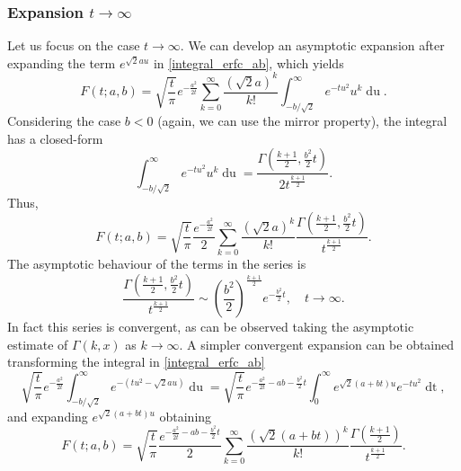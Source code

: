 \documentclass[10pt,a4paper,oneside]{article}
\numberwithin{equation}{section}
\begin{document}
\subsubsection{Expansion $t \to \infty$}

Let us focus on the case $t \to \infty$. We can develop an asymptotic expansion after expanding the term $e^{\sqrt{2}au}$ in \eqref{integral_erfc_ab}, which yields
\begin{equation*}
F(t; a, b) = \sqrt{\frac{t}{\pi}} e^{-\frac{a^2}{2t}} \sum_{k=0}^{\infty}\frac{(\sqrt{2}a)^k}{k!}\int_{-b/\sqrt{2}}^{\infty} e^{-t u^2} u^k \mathop{du}.
\end{equation*}
Considering the case $b < 0$ (again, we can use the mirror property), the integral has a closed-form
\begin{equation*}
\int_{-b/\sqrt{2}}^{\infty} e^{-t u^2} u^k \mathop{du} = \frac{\Gamma\left(\frac{k+1}{2}, \frac{b^2}{2}t\right)}{2 t^{\frac{k+1}{2}}}.
\end{equation*}
Thus,
\begin{equation}\label{phi_expansion_incgamma}
F(t; a, b) = \sqrt{\frac{t}{\pi}} \frac{e^{-\frac{a^2}{2t}}}{2}  \sum_{k=0}^{\infty}\frac{(\sqrt{2}a)^k}{k!} \frac{\Gamma\left(\frac{k+1}{2}, \frac{b^2}{2}t\right)}{t^{\frac{k+1}{2}}}.
\end{equation}
The asymptotic behaviour of the terms in the series is
\begin{equation*}
\frac{\Gamma\left(\frac{k+1}{2}, \frac{b^2}{2}t\right)}{t^{\frac{k+1}{2}}} \sim \left(\frac{b^2}{2}\right)^{\frac{k+1}{2}} e^{-\frac{b^2}{2} t}, \quad t\to\infty.
\end{equation*}
In fact this series is convergent, as can be observed taking the asymptotic estimate of $\Gamma(k, x)$ as $k \to \infty$. A simpler convergent expansion can be obtained transforming the integral in \eqref{integral_erfc_ab}
\begin{equation*}
\sqrt{\frac{t}{\pi}} e^{-\frac{a^2}{2t}} \int_{-b/\sqrt{2}}^{\infty} e^{-(tu^2 - \sqrt{2}au)} \mathop{du} = \sqrt{\frac{t}{\pi}} e^{-\frac{a^2}{2t} -ab - \frac{b^2}{2}t}\int_0^{\infty}e^{\sqrt{2}(a+bt)u} e^{-tu^2}\mathop{dt},
\end{equation*}
and expanding $e^{\sqrt{2}(a+bt)u}$ obtaining
\begin{equation}
F(t; a, b) = \sqrt{\frac{t}{\pi}} \frac{e^{-\frac{a^2}{2t} -ab - \frac{b^2}{2}t}}{2} \sum_{k=0}^{\infty} \frac{(\sqrt{2}(a+bt))^k}{k!}\frac{\Gamma\left(\frac{k+1}{2}\right)}{t^{\frac{k+1}{2}}}.
\end{equation}
\end{document}
